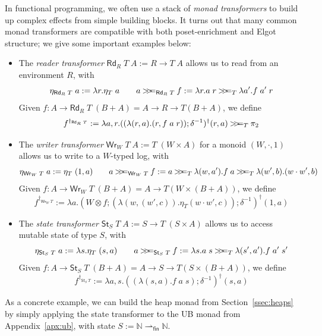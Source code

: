 \documentclass[acmsmall,screen,anonymous,review]{acmart}
\newcommand{\ms}[1]{\ensuremath{\mathsf{#1}}}
\newcommand{\nats}{\mathbb{N}}
\newcommand{\pto}{\rightharpoonup}
\newcommand{\obind}{\mathbin{>\!\!>\mkern-6.7mu=}}
\newcommand{\mbind}[3]{#2 \obind_{#1} #3}
\begin{document}
\label{apx:ub-st}

In functional programming, we often use a stack of \emph{monad transformers} to build up complex
effects from simple building blocks. It turns out that many common monad transformers are compatible
with both poset-enrichment and Elgot structure; we give some important examples below:
\begin{itemize}
  \item The \emph{reader transformer} $\ms{Rd}_R\;T\;A := R \to T\;A$ allows us to read from an
  environment $R$, with
  \begin{equation*}
  \eta_{\ms{Rd}_R\;T}\;a := \lambda r . \eta_T\;a \qquad
  \mbind{\ms{Rd}_R\;T}{a}{f} := \lambda r. \mbind{T}{a\;r}{\lambda a' . f\;a'\;r}
  \end{equation*}
  Given $f : A \to \ms{Rd}_R\;T\;(B + A) = A \to R \to T(B + A)$, we define
  \begin{equation*}
    f^{\dagger_{\ms{Rd}_R\;T}} := \lambda a, r . 
      \mbind{T}{((\lambda (r, a) . (r, f\;a\;r)) ; \delta^{-1})^\dagger(r, a)}{\pi_2}
  \end{equation*}
  \item The \emph{writer transformer} $\ms{Wr}_W\;T\;A := T\;(W \times A)$ for a monoid $(W, \cdot,
  1)$ allows us to write to a $W$-typed log, with
  \begin{equation*}
  \eta_{\ms{Wr}_W\;T}\;a := \eta_T\;(1, a) \qquad
  \mbind{\ms{Wr}_W\;T}{a}{f} := \mbind{T}{a}{\lambda (w, a') . 
    \mbind{T}{f\;a}{\lambda (w', b) . (w \cdot w', b)}}
  \end{equation*}
  Given $f : A \to \ms{Wr}_W\;T\;(B + A) = A \to T(W \times (B + A))$, we define
  \begin{equation*}
    f^{\dagger_{\ms{Wr}_W\;T}} := \lambda a . 
      (W \otimes f ; (\lambda (w, (w', c)) . \eta_T(w \cdot w', c)) ; \delta^{-1})^\dagger(1, a)
  \end{equation*}
  \item The \emph{state transformer} $\ms{St}_S\;T\;A := S \to T\;(S \times A)$ allows us to access
  mutable state of type $S$, with
  \begin{equation*}
  \eta_{\ms{St}_S\;T}\;a := \lambda s . \eta_T\;(s, a) \qquad
  \mbind{\ms{St}_S\;T}{a}{f} := \lambda s . 
    \mbind{T}{a\;s}{\lambda (s', a') . f\;a'\;s'}
  \end{equation*}
  Given $f : A \to \ms{St}_S\;T\;(B + A) = A \to S \to T(S \times (B + A))$, we define
  \begin{equation*}
    f^{\dagger_{\ms{St}_S\;T}} := \lambda a, s . 
      ((\lambda (s, a) . f\;a\;s) ; \delta^{-1})^\dagger(s, a)
  \end{equation*}
\end{itemize}
As a concrete example, we can build the heap monad from Section~\ref{ssec:heaps} by simply applying
the state transformer to the UB monad from Appendix~\ref{apx:ub}, with state $S := \nats
\pto_{\ms{fin}} \nats$.
\end{document}
